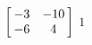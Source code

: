 {$\left[\hskip -3pt \begin{array}{cc} -3&-10\\  -6&4\end {array} \hskip -3pt
 \right]$} 
{$1$}



  

